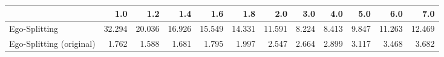 \begin{tabular}{lrrrrrrrrrrr}
\toprule
{} &    1.0 &    1.2 &    1.4 &    1.6 &    1.8 &    2.0 &   3.0 &   4.0 &   5.0 &    6.0 &    7.0 \\
\midrule
Ego-Splitting            & 32.294 & 20.036 & 16.926 & 15.549 & 14.331 & 11.591 & 8.224 & 8.413 & 9.847 & 11.263 & 12.469 \\
Ego-Splitting (original) &  1.762 &  1.588 &  1.681 &  1.795 &  1.997 &  2.547 & 2.664 & 2.899 & 3.117 &  3.468 &  3.682 \\
\bottomrule
\end{tabular}
